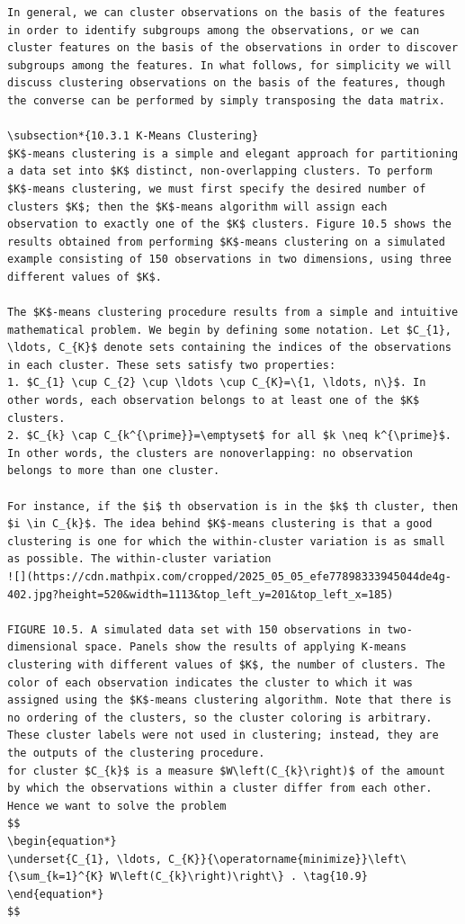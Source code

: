 \documentclass[10pt]{article}
\begin{document}
\begin{verbatim}
In general, we can cluster observations on the basis of the features in order to identify subgroups among the observations, or we can cluster features on the basis of the observations in order to discover subgroups among the features. In what follows, for simplicity we will discuss clustering observations on the basis of the features, though the converse can be performed by simply transposing the data matrix.

\subsection*{10.3.1 K-Means Clustering}
$K$-means clustering is a simple and elegant approach for partitioning a data set into $K$ distinct, non-overlapping clusters. To perform $K$-means clustering, we must first specify the desired number of clusters $K$; then the $K$-means algorithm will assign each observation to exactly one of the $K$ clusters. Figure 10.5 shows the results obtained from performing $K$-means clustering on a simulated example consisting of 150 observations in two dimensions, using three different values of $K$.

The $K$-means clustering procedure results from a simple and intuitive mathematical problem. We begin by defining some notation. Let $C_{1}, \ldots, C_{K}$ denote sets containing the indices of the observations in each cluster. These sets satisfy two properties:
1. $C_{1} \cup C_{2} \cup \ldots \cup C_{K}=\{1, \ldots, n\}$. In other words, each observation belongs to at least one of the $K$ clusters.
2. $C_{k} \cap C_{k^{\prime}}=\emptyset$ for all $k \neq k^{\prime}$. In other words, the clusters are nonoverlapping: no observation belongs to more than one cluster.

For instance, if the $i$ th observation is in the $k$ th cluster, then $i \in C_{k}$. The idea behind $K$-means clustering is that a good clustering is one for which the within-cluster variation is as small as possible. The within-cluster variation
![](https://cdn.mathpix.com/cropped/2025_05_05_efe77898333945044de4g-402.jpg?height=520&width=1113&top_left_y=201&top_left_x=185)

FIGURE 10.5. A simulated data set with 150 observations in two-dimensional space. Panels show the results of applying K-means clustering with different values of $K$, the number of clusters. The color of each observation indicates the cluster to which it was assigned using the $K$-means clustering algorithm. Note that there is no ordering of the clusters, so the cluster coloring is arbitrary. These cluster labels were not used in clustering; instead, they are the outputs of the clustering procedure.
for cluster $C_{k}$ is a measure $W\left(C_{k}\right)$ of the amount by which the observations within a cluster differ from each other. Hence we want to solve the problem
$$
\begin{equation*}
\underset{C_{1}, \ldots, C_{K}}{\operatorname{minimize}}\left\{\sum_{k=1}^{K} W\left(C_{k}\right)\right\} . \tag{10.9}
\end{equation*}
$$


\end{verbatim}
\end{document}
